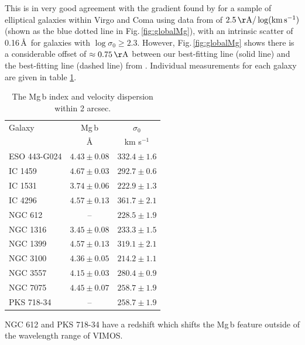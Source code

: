 			This is in very good agreement with the gradient found by \citet{Ziegler1997} for a sample of elliptical galaxies within Virgo and Coma using data from \citet{Dressler1987} of $2.5\,\mathrm{\AA/\log(km \, s^{-1})}$ (shown as the blue dotted line in Fig.\,\ref{fig:globalMg}), with an intrinsic scatter of 0.16\,\AA\ for galaxies with $\log \sigma_0 \geqslant 2.3$. However, Fig.\,\ref{fig:globalMg} shows there is a considerable offset of $\approx0.75\,\mathrm{\AA}$ between our best-fitting line (solid line) and the best-fitting line (dashed line) from \citet{Ziegler1997}. Individual measurements for each galaxy are given in table \ref{tab:globalMg}.

			\begin{table}
				\centering
			\begin{threeparttable}
				\caption{The Mg\,b index and velocity dispersion within 2 arcsec.}
				\label{tab:globalMg}
				\begin{tabular}{l c c}
					\hline
					\hline
					Galaxy 	& Mg\,b & $\sigma_0$ \\
							& \AA 	& km s$^{-1}$ \\
					\hline
					ESO 443-G024 & $4.43 \pm 0.08$ & $332.4 \pm 1.6$ \\
					IC 1459 	& $4.67 \pm 0.03$ & $292.7 \pm 0.6$ \\
					IC 1531 	& $3.74 \pm 0.06$ & $222.9 \pm 1.3$ \\
					IC 4296		& $4.57 \pm 0.13$ & $361.7 \pm 2.1$ \\
					NGC 612 	& --   			  & $228.5 \pm 1.9$ \\
					NGC 1316 	& $3.45 \pm 0.08$ & $233.3 \pm 1.5$ \\
					NGC 1399 	& $4.57 \pm 0.13$ & $319.1 \pm 2.1$ \\
					NGC 3100 	& $4.36 \pm 0.05$ & $214.2 \pm 1.1$ \\
					NGC 3557 	& $4.15 \pm 0.03$ & $280.4 \pm 0.9$ \\
					NGC 7075 	& $4.45 \pm 0.07$ & $258.7 \pm 1.9$ \\
					PKS 718-34  & -- 		      & $258.7 \pm 1.9$ \\
					\hline
					\hline
				\end{tabular}
				\begin{tablenotes}
				\footnotesize
				\note NGC 612 and PKS 718-34 have a redshift which shifts the Mg\,b feature outside of the wavelength range of VIMOS.
				\end{tablenotes}
			\end{threeparttable}
			\end{table}

